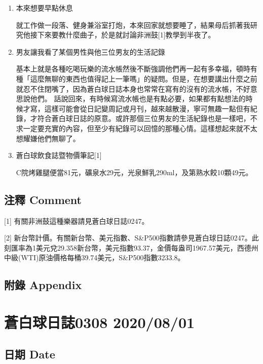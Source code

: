 \documentclass[a5paper, 11pt
]{book}
\begin{document}
\begin{enumerate}
\def\labelenumi{\arabic{enumi}.}
\item
  本來想要早點休息

  就工作做一段落、健身兼浴室打炮，本來回家就想要睡了，結果母后抓著我研究他接下來要教什麼曲子，於是就討論非洲鼓{[}1{]}教學到半夜了。
\item
  男友讓我看了某個男性與他三位男友的生活記錄

  基本上就是各種吃喝玩樂的流水帳然後不斷強調他們再一起有多幸福，頓時有種「這麼無聊的東西也值得記上一筆嗎」的疑問。但是，在想要講出什麼之前就忍不住閉嘴了，因為蒼白球日誌本身也常常在寫有的沒有的流水帳，不好意思說他們。
  話說回來，有時候寫流水帳也是有點必要，如果都有點想法的時候才寫，這樣可能會從日記變周記或月刊，越來越散漫，寧可無趣一點但有紀錄，才符合蒼白球日誌的原意。或許那個三位男友的生活紀錄也是一樣吧，不求一定要充實的內容，但至少有紀錄可以回憶的那種心情。這樣想起來就不太想耀嫌他們無聊了。
\item
  蒼白球飲食誌暨物價筆記{[}1{]}

  C院烤雞腿便當81元，礦泉水29元，光泉鮮乳290ml，及第熟水餃10顆49元。
\end{enumerate}

\hypertarget{ux6ce8ux91cb-comment-52}{%
\subsection{注釋 Comment}\label{ux6ce8ux91cb-comment-52}}

{[}1{]} 有關非洲鼓這種樂器請見蒼白球日誌0247。

{[}2{]}
新台幣計價。有關新台幣、美元指數、S\&P500指數請參見蒼白球日誌0247。此刻匯率為1美元兌29.358新台幣，美元指數93.37，金價每盎司1967.57美元，西德州中級(WTI)原油價格每桶39.74美元，S\&P500指數3233.8。

\hypertarget{ux9644ux9304-appendix-52}{%
\subsection{附錄 Appendix}\label{ux9644ux9304-appendix-52}}

\hypertarget{ux84bcux767dux7403ux65e5ux8a8c0308-20200801}{%
\section{蒼白球日誌0308
2020/08/01}\label{ux84bcux767dux7403ux65e5ux8a8c0308-20200801}}

\hypertarget{ux65e5ux671f-date-53}{%
\subsection{日期 Date}\label{ux65e5ux671f-date-53}}
\end{document}
